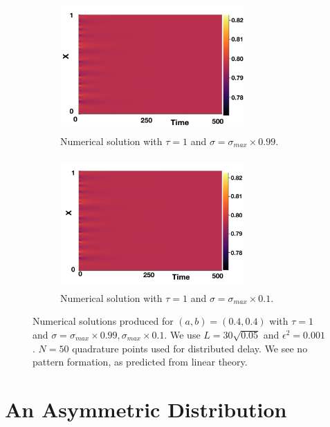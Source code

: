\begin{figure}[H]
    \centering
    \begin{subfigure}[b]{0.45\textwidth}
        \centering
        \includegraphics[width=7cm,height=5cm]{distp2sig1.png}
        \caption{Numerical solution with $\tau=1$ and $\sigma=\sigma_{max}\times0.99$.}
        \label{}
    \end{subfigure}
    \hfill
    \begin{subfigure}[b]{0.45\textwidth}
        \centering
        \includegraphics[width=7cm,height=5cm]{distp2sig2.png}
        \caption{Numerical solution with $\tau=1$ and $\sigma=\sigma_{max}\times0.1$.}
        \label{}
    \end{subfigure}
    \caption{Numerical solutions produced for $(a,b)=(0.4,0.4)$ with $\tau=1$ and $\sigma=\sigma_{max}\times0.99, \sigma_{max}\times0.1$. We use $L=30\sqrt{0.05}$ and $\epsilon^2=0.001$. $N=50$ quadrature points used for distributed delay. We see no pattern formation, as predicted from linear theory.}
    \label{fig:testdist2}
\end{figure}


\section{An Asymmetric Distribution}
